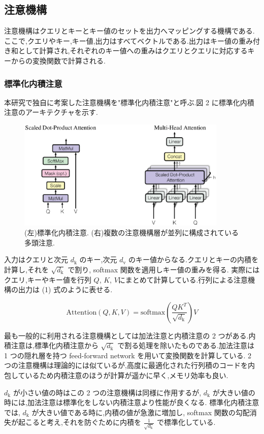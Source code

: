 \documentclass{jarticle}     %
\begin{document}
\subsection{注意機構}
注意機構はクエリとキーとキー値のセットを出力へマッピングする機構である.ここで,クエリやキー,キー値,出力はすべてベクトルである.出力はキー値の重み付き和として計算され,それぞれのキー値への重みはクエリとクエリに対応するキーからの変換関数で計算される.

\subsubsection{標準化内積注意}
本研究で独自に考案した注意機構を"標準化内積注意"と呼ぶ.図 2 に標準化内積注意のアーキテクチャを示す.\par

\begin{figure}[ht]
  \centering
  \includegraphics[width=100mm]{assets/Figure2.eps}

  \caption{(左)標準化内積注意. (右)複数の注意機構層が並列に構成されている多頭注意.}
  \label{Figure2}
\end{figure}


入力はクエリと次元 $d_\mathrm{k}$ のキー,次元 $d_\mathrm{v}$ のキー値からなる.クエリとキーの内積を計算し,それを $\sqrt{d_\mathrm{k}}$ で割り, softmax 関数を適用しキー値の重みを得る.
実際にはクエリ,キーやキー値を行列 $Q$, $K$, $V$にまとめて計算している.行列による注意機構の出力は (1) 式のように表せる.

\begin{equation}
  \mathrm{Attention}(Q,K,V) = \mathrm{softmax}(\frac{QK^T}{\sqrt{d_\mathrm{k}}})V
\end{equation}

\par

最も一般的に利用される注意機構としては加法注意と内積注意の 2 つがある.\cite{2}内積注意は,標準化内積注意から $\sqrt{d_\mathrm{k}}$ で割る処理を除いたものである.加法注意は 1 つの隠れ層を持つ feed-forward network を用いて変換関数を計算している. 2 つの注意機構は理論的には似ているが,高度に最適化された行列積のコードを内包しているため内積注意のほうが計算が遥かに早く,メモリ効率も良い.\par
$d_\mathrm{k}$ が小さい値の時はこの 2 つの注意機構は同様に作用するが, $d_\mathrm{k}$ が大きい値の時には,加法注意は標準化をしない内積注意より性能が良くなる.\cite{3} 標準化内積注意では, $d_\mathrm{k}$ が大きい値である時に,内積の値が急激に増加し, softmax 関数の勾配消失が起こると考え,それを防ぐために内積を $\frac{1}{\sqrt{d_\mathrm{k}}}$ で標準化している.
\end{document}
